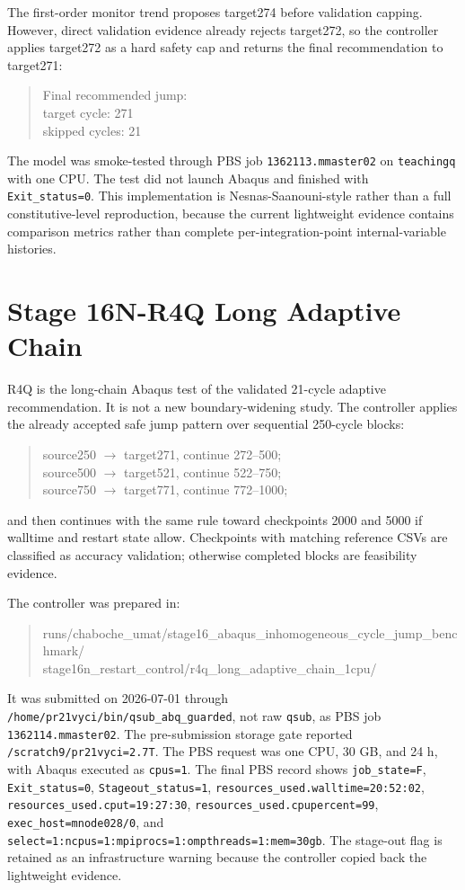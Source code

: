 \documentclass[11pt,a4paper]{article}
\newcommand{\code}[1]{\texttt{#1}}
\begin{document}
The first-order monitor trend proposes target274 before validation capping. However, direct validation evidence already rejects target272, so the controller applies target272 as a hard safety cap and returns the final recommendation to target271:
\begin{quote}\footnotesize\ttfamily
Final recommended jump:\\
\quad target cycle: 271\\
\quad skipped cycles: 21
\end{quote}

The model was smoke-tested through PBS job \code{1362113.mmaster02} on \code{teachingq} with one CPU. The test did not launch Abaqus and finished with \code{Exit\_status=0}. This implementation is Nesnas-Saanouni-style rather than a full constitutive-level reproduction, because the current lightweight evidence contains comparison metrics rather than complete per-integration-point internal-variable histories.

\section{Stage 16N-R4Q Long Adaptive Chain}

R4Q is the long-chain Abaqus test of the validated 21-cycle adaptive recommendation. It is not a new boundary-widening study. The controller applies the already accepted safe jump pattern over sequential 250-cycle blocks:
\begin{quote}
source250 $\rightarrow$ target271, continue 272--500;\\
source500 $\rightarrow$ target521, continue 522--750;\\
source750 $\rightarrow$ target771, continue 772--1000;
\end{quote}
and then continues with the same rule toward checkpoints 2000 and 5000 if walltime and restart state allow. Checkpoints with matching reference CSVs are classified as accuracy validation; otherwise completed blocks are feasibility evidence.

The controller was prepared in:
\begin{quote}\footnotesize\ttfamily
runs/chaboche\_umat/stage16\_abaqus\_inhomogeneous\_cycle\_jump\_benchmark/\\
stage16n\_restart\_control/r4q\_long\_adaptive\_chain\_1cpu/
\end{quote}
It was submitted on 2026-07-01 through \code{/home/pr21vyci/bin/qsub\_abq\_guarded}, not raw \code{qsub}, as PBS job \code{1362114.mmaster02}. The pre-submission storage gate reported \code{/scratch9/pr21vyci=2.7T}. The PBS request was one CPU, 30 GB, and 24 h, with Abaqus executed as \code{cpus=1}. The final PBS record shows \code{job\_state=F}, \code{Exit\_status=0}, \code{Stageout\_status=1}, \code{resources\_used.walltime=20:52:02}, \code{resources\_used.cput=19:27:30}, \code{resources\_used.cpupercent=99}, \code{exec\_host=mnode028/0}, and \code{select=1:ncpus=1:mpiprocs=1:ompthreads=1:mem=30gb}. The stage-out flag is retained as an infrastructure warning because the controller copied back the lightweight evidence.
\end{document}
